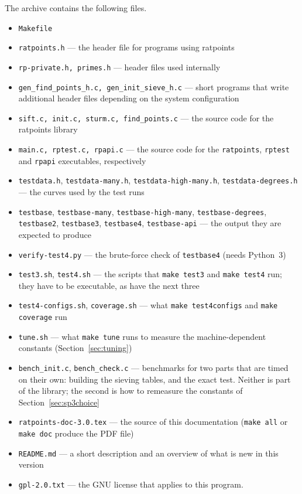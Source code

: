 \documentclass[12pt,a4paper,oneside]{amsart}
\begin{document}
{\sloppy%
The archive contains the following files.
\begin{itemize}
  \item \texttt{Makefile}
  \item \texttt{ratpoints.h} --- the header file for programs using ratpoints
  \item \texttt{rp-private.h, primes.h} --- header files used internally
  \item \texttt{gen\_find\_points\_h.c, gen\_init\_sieve\_h.c} ---
        short programs that write additional header files depending
        on the system configuration
  \item \texttt{sift.c, init.c, sturm.c, find\_points.c} ---
        the source code for the ratpoints library
  \item \texttt{main.c, rptest.c, rpapi.c} --- the source code for the
        \texttt{ratpoints}, \texttt{rptest} and \texttt{rpapi} executables,
        respectively
  \item \texttt{testdata.h}, \texttt{testdata-many.h},
        \texttt{testdata-high-many.h}, \texttt{testdata-degrees.h} ---
        the curves used by the test runs
  \item \texttt{testbase}, \texttt{testbase-many},
        \texttt{testbase-high-many}, \texttt{testbase-degrees},
        \texttt{testbase2}, \texttt{testbase3}, \texttt{testbase4},
        \texttt{testbase-api} --- the output they are expected to produce
  \item \texttt{verify-test4.py} --- the brute-force check of
        \texttt{testbase4} (needs Python~3)
  \item \texttt{test3.sh}, \texttt{test4.sh} --- the scripts that
        \texttt{make test3} and \texttt{make test4} run; they have to be
        executable, as have the next three
  \item \texttt{test4-configs.sh}, \texttt{coverage.sh} --- what
        \texttt{make test4configs} and \texttt{make coverage} run
  \item \texttt{tune.sh} --- what \texttt{make tune} runs to measure the
        machine-dependent constants (Section~\ref{sec:tuning})
  \item \texttt{bench\_init.c}, \texttt{bench\_check.c} --- benchmarks for
        two parts that are timed on their own: building the sieving tables,
        and the exact test.  Neither is part of the library; the second is
        how to remeasure the constants of Section~\ref{sec:sp3choice}
  \item \texttt{ratpoints-doc-3.0.tex} --- the source of this documentation
        (\texttt{make all} or \texttt{make doc} produce the PDF file)
  \item \texttt{README.md} --- a short description and an overview of what
        is new in this version
  \item \texttt{gpl-2.0.txt} --- the GNU license that applies to this program.
\end{itemize}%
}
\end{document}
